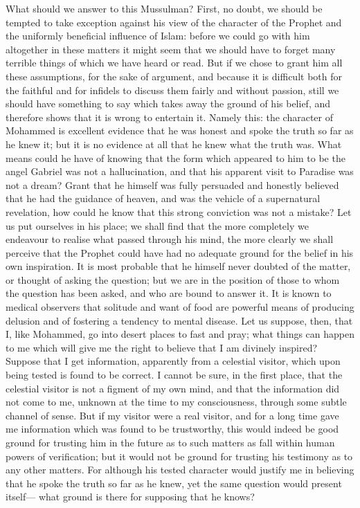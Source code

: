 \documentclass[12pt]{article}
\begin{document}
What should we answer to this Mussulman? First, no doubt, we should be tempted to take exception against his view of the character of the Prophet and the uniformly beneficial influence of Islam: before we could go with him altogether in these matters it might seem that we should have to forget many terrible things of which we have heard or read. But if we chose to grant him all these assumptions, for the sake of argument, and because it is difficult both for the faithful and for infidels to discuss them fairly and without passion, still we should have something to say which takes away the ground of his belief, and therefore shows that it is wrong to entertain it. Namely this: the character of Mohammed is excellent evidence that he was honest and spoke the truth so far as he knew it; but it is no evidence at all that he knew what the truth was. What means could he have of knowing that the form which appeared to him to be the angel Gabriel was not a hallucination, and that his apparent visit to Paradise was not a dream? Grant that he himself was fully persuaded and honestly believed that he had the guidance of heaven, and was the vehicle of a supernatural revelation, how could he know that this strong conviction was not a mistake? Let us put ourselves in his place; we shall find that the more completely we endeavour to realise what passed through his mind, the more clearly we shall perceive that the Prophet could have had no adequate ground for the belief in his own inspiration. It is most probable that he himself never doubted of the matter, or thought of asking the question; but we are in the position of those to whom the question has been asked, and who are bound to answer it. It is known to medical observers that solitude and want of food are powerful means of producing delusion and of fostering a tendency to mental disease. Let us suppose, then, that I, like Mohammed, go into desert places to fast and pray; what things can happen to me which will give me the right to believe that I am divinely inspired? Suppose that I get information, apparently from a celestial visitor, which upon being tested is found to be correct. I cannot be sure, in the first place, that the celestial visitor is not a figment of my own mind, and that the information did not come to me, unknown at the time to my consciousness, through some subtle channel of sense. But if my visitor were a real visitor, and for a long time gave me information which was found to be trustworthy, this would indeed be good ground for trusting him in the future as to such matters as fall within human powers of verification; but it would not be ground for trusting his testimony as to any other matters. For although his tested character would justify me in believing that he spoke the truth so far as he knew, yet the same question would present itself--- what ground is there for supposing that he knows?
\end{document}
